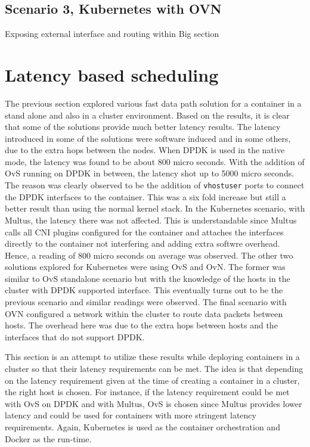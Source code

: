\documentclass[english, 12pt, a4paper, elec, utf8, a-1b, online]{aaltothesis}
\begin{document}
\subsection{Scenario 3, Kubernetes with OVN}
Exposing external interface and routing within
Big section




\clearpage
\section{Latency based scheduling}
The previous section explored various fast data path solution for a container in a stand alone and also in a cluster environment. Based on the results, it is clear that some of the solutions provide much better latency results. The latency introduced in some of the solutions were software induced and in some others, due to the extra hops between the nodes. When DPDK is used in the native mode, the latency was found to be about 800 micro seconds. With the addition of OvS running on DPDK in between, the latency shot up to 5000 micro seconds. The reason was clearly observed to be the addition of \lstinline{vhostuser} ports to connect the DPDK interfaces to the container. This was a six fold increase but still a better result than using the normal kernel stack. In the Kubernetes scenario, with Multus, the latency there was not affected. This is understandable since Multus calls all CNI plugins configured for the container and attaches the interfaces directly to the container not interfering and adding extra softwre overhead. Hence, a reading of 800 micro seconds on average was observed. The other two solutions explored for Kubernetes were using OvS and OvN. The former was similar to OvS standalone scenario but with the knowledge of the hosts in the cluster with DPDK supported interface. This eventually turns out to be the previous scenario and similar readings were observed. The final scenario with OVN configured a network within the cluster to route data packets between hosts. The overhead here was due to the extra hops between hosts and the interfaces that do not support DPDK.

This section is an attempt to utilize these results while deploying containers in a cluster so that their latency requirements can be met. The idea is that depending on the latency requirement given at the time of creating a container in a cluster, the right host is chosen. For instance, if the latency requirement could be met with OvS on DPDK and with Multus, OvS is chosen since Multus provides lower latency and could be used for containers with more stringent latency requirements. Again, Kubernetes is used as the container orchestration and Docker as the run-time.
\end{document}
